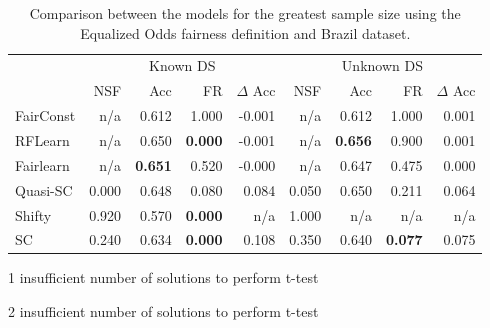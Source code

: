 \begin{table}[H]
\begin{threeparttable}
\centering
\begin{tabular}{lrrrrrrrr}
\toprule
 & \multicolumn{4}{c}{Known DS} & \multicolumn{4}{c}{Unknown DS} \\
 & NSF & Acc & FR & $\Delta$ Acc & NSF & Acc & FR & $\Delta$ Acc \\
\cmidrule(r){2-5} \cmidrule{6-9}
FairConst & n/a & 0.612 & 1.000 & -0.001 & n/a & 0.612 & 1.000 & 0.001 \\
RFLearn & n/a & 0.650 & \bfseries 0.000 & -0.001 & n/a & \bfseries 0.656 & 0.900 & 0.001 \\
Fairlearn & n/a & \bfseries 0.651 & 0.520 & -0.000 & n/a & 0.647 & 0.475 & 0.000 \\
Quasi-SC & 0.000 & 0.648 & 0.080 & 0.084 & 0.050 & 0.650 & 0.211 & 0.064 \\
Shifty & 0.920 & 0.570\tnote{1} & \bfseries 0.000 & n/a & 1.000 & n/a\tnote{2} & n/a & n/a \\
SC & 0.240 & 0.634 & \bfseries 0.000 & 0.108 & 0.350 & 0.640 & \bfseries 0.077 & 0.075 \\
\bottomrule
\end{tabular}
\begin{tablenotes}
\item[1] insufficient number of solutions to perform t-test
\item[2] insufficient number of solutions to perform t-test
\end{tablenotes}
\end{threeparttable}
\caption{Comparison between the models for the greatest sample size using the Equalized Odds fairness definition and Brazil dataset.}
\label{eodds_brazil}
\end{table}
